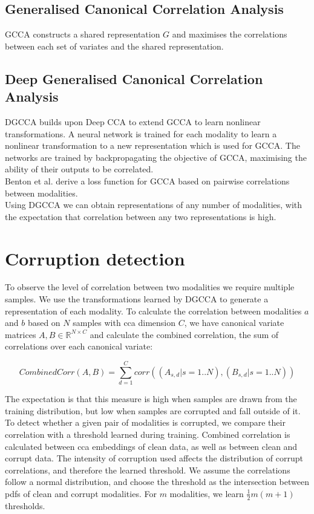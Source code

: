 \subsection{Generalised Canonical Correlation Analysis}
GCCA \cite{GCCA} constructs a shared representation $G$ and maximises the correlations between each set of variates and  the shared representation.

\subsection{Deep Generalised Canonical Correlation Analysis}
DGCCA builds upon Deep CCA \cite{DCCA} to extend GCCA to learn nonlinear transformations. A neural network is trained for each modality to learn a nonlinear transformation to a new representation which is used for GCCA. The networks are trained by backpropagating the objective of GCCA, maximising the ability of their outputs to be correlated.\\

Benton et al. \cite{DGCCA} derive a loss function for GCCA based on pairwise correlations between modalities.\\

Using DGCCA we can obtain representations of any number of modalities, with the expectation that correlation between any two representations is high.

\section{Corruption detection}
To observe the level of correlation between two modalities we require multiple samples. We use the transformations learned by DGCCA to generate a representation of each modality. To calculate the correlation between modalities $a$ and $b$ based on $N$ samples with cca dimension $C$, we have canonical variate matrices $A, B \in \mathbb{R}^{N\times C}$ and calculate the combined correlation, the sum of correlations over each canonical variate:

$$CombinedCorr(A, B) = \sum_{d=1}^C{corr((A_{s,d} | s=1..N), (B_{s,d} | s=1..N))}$$

The expectation is that this measure is high when samples are drawn from the training distribution, but low when samples are corrupted and fall outside of it.\\

To detect whether a given pair of modalities is corrupted, we compare their correlation with a threshold learned during training. Combined correlation is calculated between cca embeddings of clean data, as well as between clean and corrupt data. The intensity of corruption used affects the distribution of corrupt correlations, and therefore the learned threshold. We assume the correlations follow a normal distribution, and choose the threshold as the intersection between pdfs of clean and corrupt modalities. For $m$ modalities, we learn $\frac{1}{2}m(m+1)$ thresholds.\\

